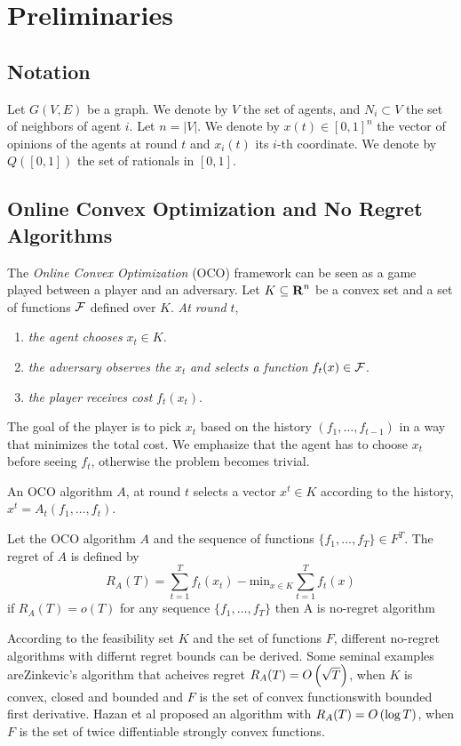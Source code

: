 \section{Preliminaries}\label{s:preliminaries}
\subsection{Notation}
Let $G(V,E)$ be a graph. We denote by $V$ the set of agents,
and $N_{i} \subset V$ the set of neighbors of agent $i$. Let $n = |V|$.
We denote by $x(t)\in [0,1]^n$ the vector of opinions of the agents at round
$t$ and $x_i(t)$ its $i$-th coordinate. We denote by $Q([0,1])$
the set of rationals in $[0,1]$.

\subsection{Online Convex Optimization and No Regret Algorithms}
\label{s:preliminaries:oco}
The \emph{Online Convex Optimization} (OCO) framework can be seen
as a game played between a player and an adversary. Let
$K \subseteq \bm{\mathrm{R}}^n$ be a convex set and a set of functions
$\mathcal{F}$ defined over $K$. \emph{At round }$t$,
\begin{enumerate}
  \item \emph{the agent chooses }$x_t \in K$.

  \item \emph{the adversary observes the }$x_t$\emph{ and selects a function}
    $f_t(x) \in \mathcal{F}$.

  \item \emph{the player receives cost }$f_t(x_t)$.
\end{enumerate}


\noindent The goal of the player is to pick $x_t$ based on the history
$(f_1,\ldots,f_{t-1})$ in a way that minimizes the total cost. We emphasize
that the agent has to choose $x_t$ before seeing $f_t$, otherwise the
problem becomes trivial.
\begin{definition}
An OCO algorithm $A$, at round $t$ selects a vector $x^t \in K$ according to the
history, \(x^t = A_t(f_1,\ldots,f_t)\).
\end{definition}

\begin{definition}
Let the OCO algorithm $A$ and the sequence of functions
$\{f_1,\ldots,f_T\} \in F^T$. The regret of $A$ is defined by
\[R_A(T) = \sum_{t=1}^Tf_t(x_t) - \text{min}_{x \in K}\sum_{t=1}^Tf_t(x)\]
if $R_A(T) = o(T)$ for any sequence $\{f_1,\ldots,f_T\}$ then A is no-regret
algorithm
\end{definition}
%
According to the feasibility set $K$ and the set of functions $F$, different no-regret algorithms with differnt regret bounds can be derived.
Some seminal examples areZinkevic's algorithm that acheives regret $R_A(T) =O\left(\sqrt{T}\right)$, when $K$ is convex, closed and bounded and
$F$ is the set of convex functionswith bounded first derivative. Hazan et al \cite{} proposed an algorithm with $R_A(T) =O\left(\log T\right)$,
when $F$ is the set of twice diffentiable strongly convex functions.\\

